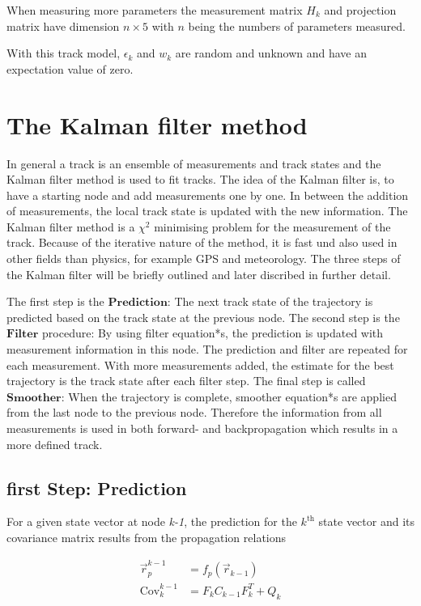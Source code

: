 When measuring more parameters the measurement matrix $H_k$ and projection matrix have dimension $n\times5$ with $n$ being the numbers of parameters measured.

With this track model, $\epsilon_k$ and $w_k$ are random and unknown and have an expectation value of zero.

\section{The Kalman filter method \cite{VanTilburg}}
In general a track is an ensemble of measurements and track states and the Kalman filter method is used to fit tracks.
The idea of the Kalman filter is, to have a starting node and add measurements one by one. In between the addition of measurements, the local track state is updated with the new information.
The Kalman filter method is a $\chi^2$ minimising problem for the measurement of the track. Because of the iterative nature of the method, it is fast und also used in other fields than physics, for example GPS and meteorology.
The three steps of the Kalman filter will be briefly outlined and later discribed in further detail.

The first step is the $\symbf{Prediction}$: The next track state of the trajectory is predicted based on the track state at the previous node.
The second step is the $\symbf{Filter}$ procedure: By using filter equation*s, the prediction is updated with measurement information in this node. The prediction and filter are repeated for each measurement. With more measurements added, the estimate for the best trajectory is the track state after each filter step.
The final step is called $\symbf{Smoother}$: When the trajectory is complete, smoother equation*s are applied from the last node to the previous node. Therefore the information from all measurements is used in both forward- and backpropagation which results in a more
defined track.

\subsection{first Step: Prediction}
For a given state vector at node \textit{k-1}, the prediction for the $k^{\text{th}}$ state vector and its covariance matrix results from the propagation relations

\begin{align*}
  \vec{r}_p^{k-1} &= f_p\left( \vec{r}_{k-1} \right) \\
  \text{Cov}_k^{k-1} &= F_k C_{k-1} F_k^T + Q_k
\end{align*}

